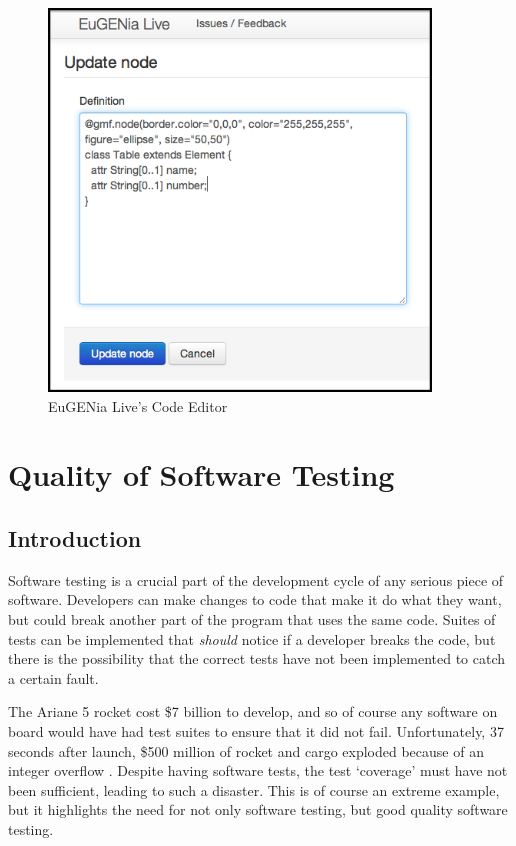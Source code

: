 \begin{figure}[h]
\begin{center}
	\includegraphics[width=4in]{figures/eugenia_live_code.png}
\end{center}
\caption{EuGENia Live's Code Editor \citep{eugeniaLiveDocumentation}}
\label{eugeniaLiveCode}
\end{figure}


\section{Quality of Software Testing}
\subsection{Introduction}
Software testing is a crucial part of the development cycle of any serious piece of software. Developers can make changes to code that make it do what they want, but could break another part of the program that uses the same code. Suites of tests can be implemented that \emph{should} notice if a developer breaks the code, but there is the possibility that the correct tests have not been implemented to catch a certain fault.

The Ariane 5 rocket cost \$7 billion to develop, and so of course any software on board would have had test suites to ensure that it did not fail. Unfortunately, 37 seconds after launch, \$500 million of rocket and cargo exploded because of an integer overflow \citep{ariane5}. Despite having software tests, the test `coverage' must have not been sufficient, leading to such a disaster. This is of course an extreme example, but it highlights the need for not only software testing, but good quality software testing.


